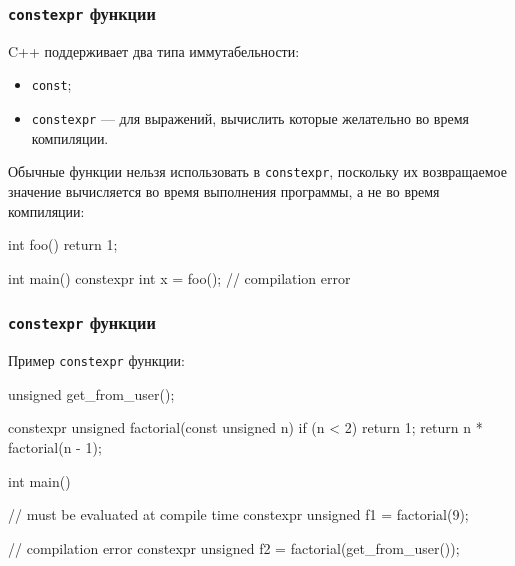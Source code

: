 \documentclass[compress, 8pt]{beamer}
\begin{document}
\begin{frame}[fragile]

    \frametitle{\texttt{constexpr} функции}

    C++ поддерживает два типа иммутабельности:

    \begin{itemize}
        \item \verb|const|;
        \item \verb|constexpr|\footnotemark{} --- для выражений, вычислить которые
            желательно во время компиляции.
    \end{itemize}


    \hfill\break
    Обычные функции нельзя использовать в \verb|constexpr|, поскольку
    их возвращаемое значение вычисляется во время выполнения программы, а не во время
    компиляции:

    \begin{myinplacelisting}[minted language=cpp]
int foo() { return 1; }

int main() {
    constexpr int x = foo(); // compilation error
}
    \end{myinplacelisting}

\end{frame}

\begin{frame}[fragile]

    \frametitle{\texttt{constexpr} функции}

    Пример \verb|constexpr| функции:

    \begin{myinplacelisting}[minted language=cpp]
unsigned get_from_user();

constexpr unsigned factorial(const unsigned n) {
    if (n < 2) {
        return 1;
    }
    return n * factorial(n - 1);
}

int main() {
    // must be evaluated at compile time
    constexpr unsigned f1 = factorial(9);

    // compilation error
    constexpr unsigned f2 = factorial(get_from_user());
}
    \end{myinplacelisting}

\end{frame}
\end{document}
